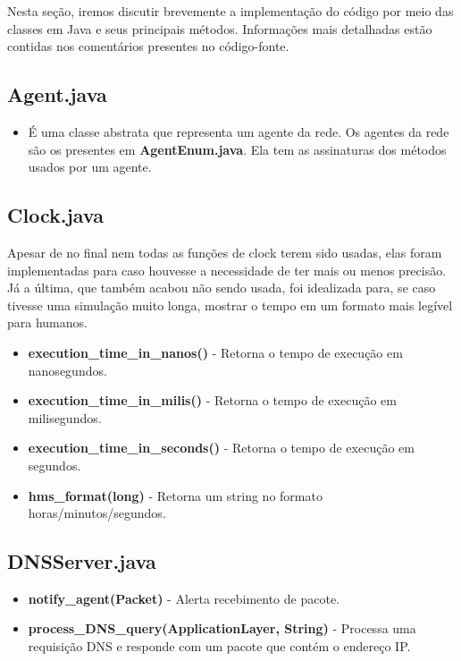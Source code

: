 \documentclass[11pt]{article}
\begin{document}
Nesta seção, iremos discutir brevemente a implementação do código por meio das classes em Java e seus principais métodos. Informações mais detalhadas estão contidas nos comentários presentes no código-fonte.

\subsection{Agent.java}

\begin{itemize}
	\item É uma classe abstrata que representa um agente da rede. Os agentes da rede são os presentes em \textbf{AgentEnum.java}. Ela tem as assinaturas dos métodos usados por um agente.
\end{itemize}

\subsection{Clock.java}

Apesar de no final nem todas as funções de clock terem sido usadas, elas foram implementadas para caso houvesse a necessidade de ter mais ou menos precisão. Já a última, que também acabou não sendo usada, 
foi idealizada para, se caso tivesse uma simulação muito longa, mostrar o tempo em um formato mais legível para humanos.
\begin{itemize}
	\item \textbf{execution_time_in_nanos()} - Retorna o tempo de execução em nanosegundos.
	\item \textbf{execution_time_in_milis()} - Retorna o tempo de execução em milisegundos.
	\item \textbf{execution_time_in_seconds()} - Retorna o tempo de execução em segundos.
	\item \textbf{hms_format(long)} - Retorna um string no formato horas/minutos/segundos.
\end{itemize}

\subsection{DNSServer.java}

\begin{itemize}
	\item \textbf{notify_agent(Packet)} - Alerta recebimento de pacote.
	\item \textbf{process_DNS_query(ApplicationLayer, String)} - Processa uma requisição DNS e responde com um pacote que contém o endereço IP.
\end{itemize}
\end{document}
